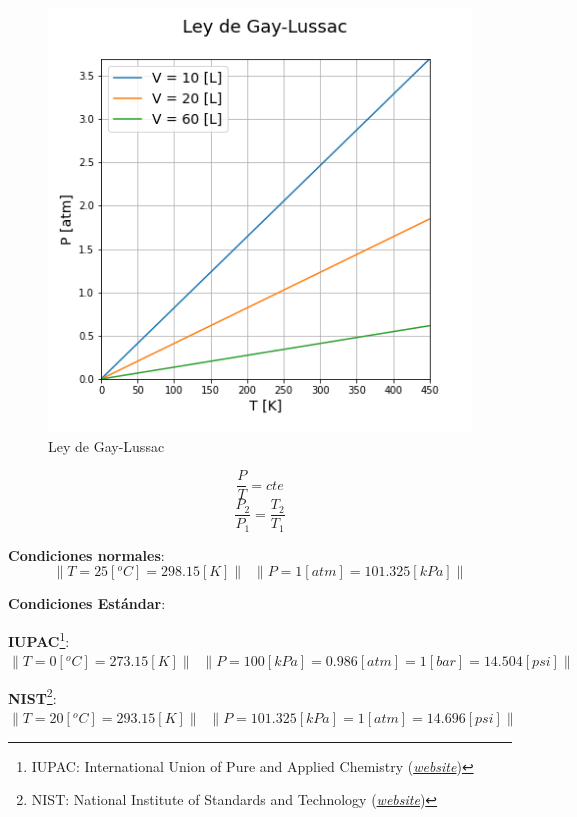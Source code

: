         \begin{minipage}{0.5\linewidth}
            \begin{figure}
                \centering
                \includegraphics[width=\textwidth]{img/graficos/ley_gay_lussac.png}
                \caption{Ley de Gay-Lussac}
                \label{fig:pt}
            \end{figure}
        \end{minipage}
        \begin{minipage}{0.4\linewidth}
            \[\frac{P}{T} = cte\]
            \[\frac{P_{2}}{P_{1}} = \frac{T_{2}}{T_{1}}\]
        \end{minipage}
    
            
            \textbf{Condiciones normales}:
            \[\left \| T = 25 [{}^{o}C] = 298.15 [K] \right \| \;\;  \left \| P = 1 [atm] = 101.325 [kPa] \right \|\]
            
            \textbf{Condiciones Estándar}:
            
            \begin{center}
                \textbf{IUPAC}\footnote{IUPAC: International Union of Pure and Applied Chemistry (\href{https://iupac.org/}{\textit{website}})}: \(\left \| T = 0 [{}^{o}C] = 273.15 [K] \right \| \;\;  \left \| P = 100 [kPa] = 0.986 [atm] = 1 [bar] = 14.504 [psi]  \right \|\)
                
                \textbf{NIST}\footnote{NIST: National Institute of Standards and Technology (\href{https://www.nist.gov/}{\textit{website}})}: \(\left \| T = 20 [{}^{o}C] = 293.15 [K] \right \| \;\;  \left \| P = 101.325 [kPa] = 1 [atm] = 14.696 [psi]  \right \|\)
            \end{center}
        
